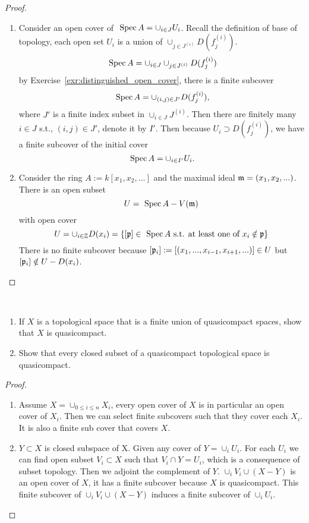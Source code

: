 \begin{proof}
\begin{enumerate}[label=(\alph*)]
\item
Consider an open cover of $\text{ Spec\,} A=\cup_{i\in J}U_i$. Recall the definition of base of topology, each open set $U_i$ is a union of $\cup_{j\in J^{(i)}}D(f^{(i)}_j)$. 
$$
\text{ Spec\,} A=\cup_{i\in J}\cup_{j\in J^{(i)}}D(f^{(i)}_j)
$$
by Exercise~\ref{exr:distinguished_open_cover}, there is a finite subcover
$$
\text{ Spec\,} A=\cup_{(i,j)\in J'}D(f^{(i)}_j),
$$
where $J'$ is a finite index subset in $\cup_{i\in J}J^{(i)}$. Then there are finitely many $i\in J$ s.t., $(i,j)\in J'$, denote it by $I'$. Then because $U_i\supset D(f^{(i)}_j)$, we have a finite subcover of the initial cover
$$
\text{ Spec\,} A=\cup_{i\in I'} U_i.
$$
\item Consider the ring $A:=k[x_1,x_2,...]$ and the maximal ideal ${\mathfrak m}=(x_1,x_2,...)$. There is an open subset 
$$
U=\text{ Spec\,} A-V({\mathfrak m})
$$
with open cover
$$
U=\cup_{i\in\mathbb Z} D(x_i)=\{[{\mathfrak p}]\in\text{ Spec\,} A\text{ s.t. at least one of $x_i\notin {\mathfrak p}$}\}
$$
There is no finite subcover because $[{\mathfrak p}_i]:=[(x_1,...,x_{i-1},x_{i+1},...)]\in U$ but $[{\mathfrak p}_i]\notin U-D(x_i)$.
\end{enumerate}
\end{proof}

\begin{exr}\ 
\begin{enumerate}[label=(\alph*)]
\item 
 If $X$ is a topological space that is a finite union of quasicompact spaces, show that $X$ is quasicompact.
\item  Show that every closed subset of a quasicompact topological space is quasicompact.
\end{enumerate}
\end{exr}
\begin{proof}
\begin{enumerate}[label=(\alph*)]
\item Assume $X=\cup_{0\leq i\leq n} X_i$, every open cover of $X$ is in particular an open cover of $X_i$. Then we can select finite subcovers such that they cover each $X_i$. It is also a finite sub cover that covers $X$.
\item $Y\subset X$ is closed subspace of X. Given any cover of $Y=\cup_i U_i$. For each $U_i$ we can find open subset $V_i\subset X$ such that $V_i\cap Y=U_i$, which is a consequence of subset topology. Then we adjoint the complement of $Y$. $\cup_{i} V_i\cup (X-Y)$ is an open cover of $X$, it has a finite subcover because $X$ is quasicompact. This finite subcover of $\cup_{i} V_i\cup (X-Y)$ induces a finite subcover of $\cup_{i} U_i$.
\end{enumerate}
\end{proof}

